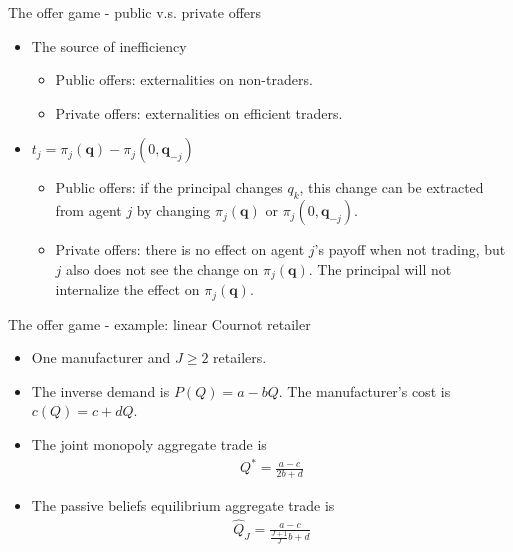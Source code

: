 \documentclass[aspectratio=169]{beamer}  %
\begin{document}
\begin{frame}{The offer game - public v.s. private offers}
    \begin{itemize}
        \item The source of inefficiency \vspace{.2cm}
        \begin{itemize}
            \item Public offers: externalities on non-traders. \vspace{.2cm}
            \item Private offers: externalities on efficient traders. \vspace{.2cm} 
        \end{itemize}
        \item $t_j = \pi_j(\mathbf{q}) - \pi_j(0,\mathbf{q}_{-j})$\vspace{.2cm}
        \begin{itemize}
            \item Public offers: if the principal changes $q_k$, this change can be extracted from agent $j$ by changing $\pi_j(\mathbf{q})$ or $\pi_j(0,\mathbf{q}_{-j})$. \vspace{.2cm}
            \item Private offers: there is no effect on agent $j$'s payoff when not trading, but $j$ also does not see the change on $\pi_j(\mathbf{q})$. The principal will not internalize the effect on $\pi_j(\mathbf{q})$.
        \end{itemize}
    \end{itemize}   
    
\end{frame}


\begin{frame}{The offer game - example: linear Cournot retailer}
    \begin{itemize}
        \item One manufacturer and $J\geq2$ retailers. \vspace{.2cm}
        \item The inverse demand is $P(Q) = a - bQ$. The manufacturer's cost is $c(Q) = c + dQ$. \vspace{.2cm}
        \item The joint monopoly aggregate trade is 
        \begin{align}
            Q^* = \frac{a-c}{2b+d}
        \end{align}
        \item The passive beliefs equilibrium aggregate trade is
        \begin{align}
            \hat{Q}_J = \frac{a-c}{\frac{J+1}{J}b+d}
        \end{align}
    \end{itemize}
\end{frame}
\end{document}
